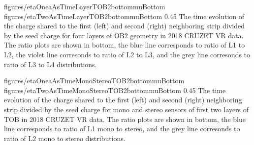 

                 {figures/etaOneaAsTimeLayerTOB2bottommuBottom}
                 {figures/etaTwoAsTimeLayerTOB2bottommuBottom} %
                 {0.45}       %
                 { The time evolution of the charge shared to the first (left) and second (right) neighboring strip divided by the seed charge for four layers of OB2 geometry in 2018 CRUZET VR data. The ratio plots are shown in bottom, the blue line corresponds to ratio of L1 to L2, the violet line corresonds to ratio of L2 to L3, and the grey line corresonds to ratio of L3 to L4 distributions. }


                 {figures/etaOneaAsTimeMonoStereoTOB2bottommuBottom}
                 {figures/etaTwoAsTimeMonoStereoTOB2bottommuBottom} %
                 {0.45}       %
                 { The time evolution of the charge shared to the first (left) and second (right) neighboring strip divided by the seed charge for mono and stereo sensors of first two layers of TOB in 2018 CRUZET VR data. The ratio plots are shown in bottom, the blue line corresponds to ratio of L1 mono to stereo, and the grey line corresonds to ratio of L2 mono to stereo distributions. }


